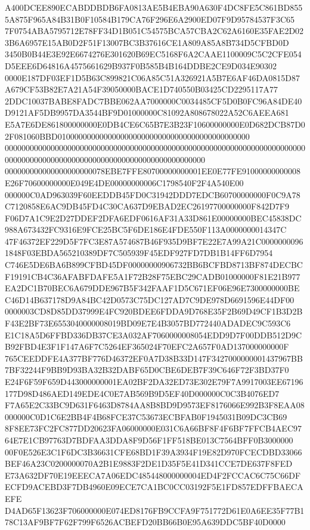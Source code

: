 \documentclass[UTF8,fontset=fandol,zihao=-4,a4paper]{ctexart}
\begin{document}
{{A400DCEE890ECABDDBDB6FA0813AE5B4EBA90A630F4DC8FE5C861BD8555A875F965A84B31B0F10584B179CA76F296E6A2900ED07F9D95784537F3C65
7F0754ABA5795712E78FF34D1B051C54575BCA57CBA2C62A6160E35FAE2D023B6A6957E15AB0D2F51F13007BC3B37616CE1A809A85A8B734D5CFBD0D
3450B0B44E3E92E6674276E301620B69EC5168F6A2CAAE1100009C5C2CFE054D5EEE6D64816A4575661629B937F0B585B4B164DDBE2CE9D034E90302
0000E187DF03EF1D5B63C899821C06A85C51A326921A5B7E6AF46DA0815D87A679CF53B82E7A21A54F39050000BACE1D740550B03425CD2295117A77
2DDC10037BABE8FADC7BBE062AA7000000C0034485CF5D0B0FC96A84DE40D9121AF5DB9957DA3544BF9D01000000C81092A808678022A52C6AEEA681
E5A7E6DE861800000000E0DB4CE6C65B7E3B23F10600000000E0D682DCB87D02F081060BBD0100000000000000000000000000000000000000000000
000000000000000000000000000000000000000000000000000000000000000000000000000000000000000000000000000000000000000000000000
000000000000000000000078EBE7FFE80700000000001EE0E77FE91000000000008E26F70600000000E049E4DE00000000006C1798540F2F4A540E00
000000C0AD963039F60EEDDB45FD0C31942DDD7EDCB60700000000F0C9A78C7120858E6AC9DB45FD4C30CA637D9EBAD2EC26197700000000F842D7F9
F06D7A1C9E2D27DDEF2DFA6EDF0616AF31A33D861E00000000BEC45838DC988A673432FC9316E9FCE25BC5F6DE186E4FDE550F113A0000000014347C
47F46372EF229D5F7FC3E87A574687B46F935D9BF7E22E7A99A21C00000000961848F03EBDA565210389DF7C505939F45EDF927FD7DB1B14FF6D7954
C746E5DE6BA6B899CFBD45DF00000000906732BB6BCFBD8713BF874DECBCF19191CB4C36AFABFDAFE5A1F72B28F75EBC29CADB01000000F81E21B977
EA2DC1B70BEC6A679DDE967B5F342FAAF1D5C671EF06E96E7300000000BEC46D14B637178D9A84BC42D0573C75DC127AD7C9DE978D6691596E44DF00
0000003CD8D85DD37999E4FC920BDEE6FDDA9D768E35F2B69D49CF1B3D2BF43E2BF73E6553040000008019BD09E7E4B3057BD772440ADADEC9C593C6
E1C18A5D6FFBD336DB37CE3A032AF7060000008054EDD9D7F00DDB512D9CB92FBD4E3F1F147A6F7C5264EF365024F70EFC2A657F0AD137000000000F
765CEEDDFE4A377BF776D46372EF0A7D38B33D147F3427000000001437967BB7BF32244F9BB9D93BA32B32DABF65D0CBE6DEB7F39C646F72F3BD37F0
E24F6F59F659D443000000001EA02BF2DA32ED73E302E79F7A9917003EE67196177D98D486AED149EDE4C0E7AB569B9D5EF40D000000C0C3B4076ED7
F7A65E2C33BC9D631F6463D8784AA8B8BD9D9573EF8176066E992B3F8EAA08000000C0D1C6E2BB4F4B68FCE37C53673ECBFAB0F1945031B09DC3CB69
8F8EE73FC2FC877DD20623FA06000000E031C6A66BF8F4F6BF7FFCB4AEC9764E7E1CB97763D7BDFAA3DDA8F9D56F1FF518BE013C7564BFF0B3000000
00F0E526E3C1F6DC3B36631CFE68BD1F39A3934F19E82D970FCECDBD33066BEF46A23C0200000070A2B1E9883F2DE1D35F5E41D341CCE7DE637F8FED
E73A632DF70E19EEECA7A06EDC485448000000004ED4F2FCCAC6C75C66DFECFD9ACEBD3F7DB4960E09ECE7CA1BC0CC03192F5E1FD857EDFFBAECAEFE
D4AD65F13623F706000000E074ED8176FB9CCFA9F751772D61E0A6EE35F77B178C13AF9BF7F62F799F6526ACBEFD20BB66B0E95A639DDC5BF40D0000
}}
\end{document}
